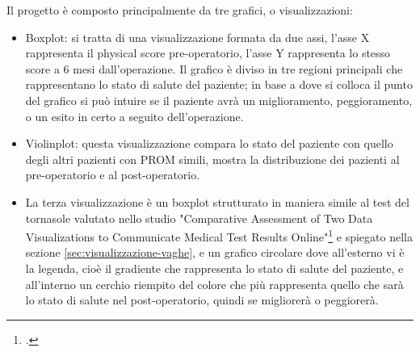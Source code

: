 Il progetto è composto principalmente da tre grafici, o visualizzazioni: 
\begin{itemize}
    \item Boxplot: si tratta di una visualizzazione formata da due assi, l'asse X rappresenta il physical score pre-operatorio, l'asse Y rappresenta lo stesso score a 6 mesi dall'operazione. Il grafico è diviso in tre regioni principali che rappresentano lo stato di salute del paziente; in base a dove si colloca il punto del grafico si può intuire se il paziente avrà un miglioramento, peggioramento, o un esito in certo a seguito dell'operazione. 
    \item Violinplot: questa visualizzazione compara lo stato del paziente con quello degli altri pazienti con PROM simili, mostra la distribuzione dei pazienti al pre-operatorio e al post-operatorio. 
    \item La terza visualizzazione è un boxplot strutturato in maniera simile al test del tornasole valutato nello studio "Comparative Assessment of Two Data Visualizations to Communicate Medical Test Results Online"\footcite{womak:comparative-assesment} e spiegato nella sezione \ref*{sec:visualizzazione-vaghe}, e un grafico circolare dove all'esterno vi è la legenda, cioè il gradiente che rappresenta lo stato di salute del paziente, e all'interno un cerchio riempito del colore che più rappresenta quello che sarà lo stato di salute nel post-operatorio, quindi se migliorerà o peggiorerà. 
\end{itemize}

